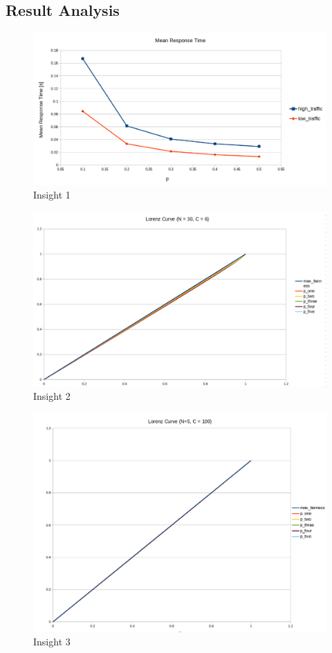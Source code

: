\subsection{Result Analysis}

\begin{figure}[H]
	\centering
	\includegraphics[width=\textwidth]{img/MeanResponseTimeInsight.png}
	\caption{Insight 1}
\end{figure}
\begin{figure}[H]
	\centering
	\includegraphics[width=\textwidth]{img/LorenzHighTraffic.png}
	\caption{Insight 2}
\end{figure}
\begin{figure}[H]
	\centering
	\includegraphics[width=\textwidth]{img/LorenzLowTraffic.png}
	\caption{Insight 3}
\end{figure}
